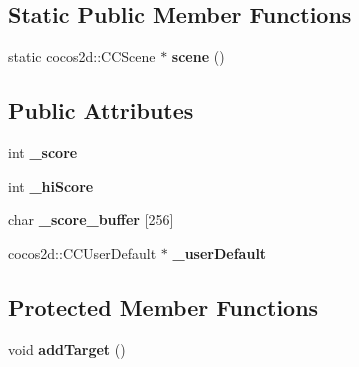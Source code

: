 \subsection*{Static Public Member Functions}
\begin{DoxyCompactItemize}
\item 
\hypertarget{class_hello_world_a87d382485674f9db23369394d36a780a}{static cocos2d\-::\-C\-C\-Scene $\ast$ {\bfseries scene} ()}\label{class_hello_world_a87d382485674f9db23369394d36a780a}

\end{DoxyCompactItemize}
\subsection*{Public Attributes}
\begin{DoxyCompactItemize}
\item 
\hypertarget{class_hello_world_a57bc6b956f2a212f612b08cff5e1667e}{int {\bfseries \-\_\-score}}\label{class_hello_world_a57bc6b956f2a212f612b08cff5e1667e}

\item 
\hypertarget{class_hello_world_aa899c2923d856ad16f91e0d87356982d}{int {\bfseries \-\_\-hi\-Score}}\label{class_hello_world_aa899c2923d856ad16f91e0d87356982d}

\item 
\hypertarget{class_hello_world_a3d2462bb81140ff279f75264f0387c8e}{char {\bfseries \-\_\-score\-\_\-buffer} \mbox{[}256\mbox{]}}\label{class_hello_world_a3d2462bb81140ff279f75264f0387c8e}

\item 
\hypertarget{class_hello_world_a7927828732546d75b1ca0b44becb237a}{cocos2d\-::\-C\-C\-User\-Default $\ast$ {\bfseries \-\_\-user\-Default}}\label{class_hello_world_a7927828732546d75b1ca0b44becb237a}

\end{DoxyCompactItemize}
\subsection*{Protected Member Functions}
\begin{DoxyCompactItemize}
\item 
\hypertarget{class_hello_world_a78f50db0ec7d4f3952e99082f3082e11}{void {\bfseries add\-Target} ()}\label{class_hello_world_a78f50db0ec7d4f3952e99082f3082e11}

\end{DoxyCompactItemize}
